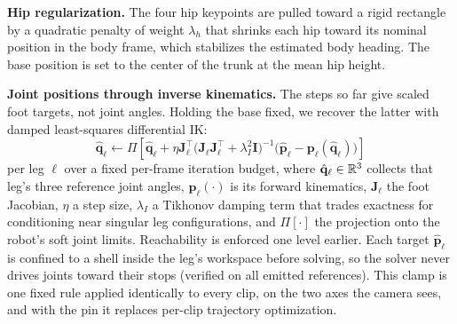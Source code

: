 \documentclass[letterpaper, 10 pt, conference]{ieeeconf}
\begin{document}
\textbf{Hip regularization.}
The four hip keypoints are pulled toward a rigid rectangle by a quadratic penalty of weight $\lambda_h$ that shrinks each hip toward its nominal position in the body frame, which stabilizes the estimated body heading. The base position is set to the center of the trunk at the mean hip height.


\textbf{Joint positions through inverse kinematics.} The steps so far give scaled foot targets, not joint angles. Holding the base fixed, we recover the latter with damped least-squares differential IK:
\begin{equation}
\hat{\mathbf{q}}_\ell \leftarrow \Pi\!\left[\hat{\mathbf{q}}_\ell + \eta \mathbf{J}_\ell^\top \big(\mathbf{J}_\ell\mathbf{J}_\ell^\top+\lambda_I^2\mathbf{I}\big)^{-1}\big(\hat{\mathbf{p}}_\ell-\mathbf{p}_\ell(\hat{\mathbf{q}}_\ell)\big)\right]
\label{eq:ik}
\end{equation}
per leg $\ell$ over a fixed per-frame iteration budget, where $\hat{\mathbf{q}}_\ell\in\mathbb{R}^3$ collects that leg's three reference joint angles, $\mathbf{p}_\ell(\cdot)$ is its forward kinematics, $\mathbf{J}_\ell$ the foot Jacobian, $\eta$ a step size, $\lambda_I$ a Tikhonov damping term that trades exactness for conditioning near singular leg configurations, and $\Pi[\cdot]$ the projection onto the robot's soft joint limits. Reachability is enforced one level earlier. Each target $\hat{\mathbf{p}}_\ell$ is confined to a shell inside the leg's workspace before solving, so the solver never drives joints toward their stops (verified on all emitted references). This clamp is one fixed rule applied identically to every clip, on the two axes the camera sees, and with the pin it replaces per-clip trajectory optimization.
\end{document}

